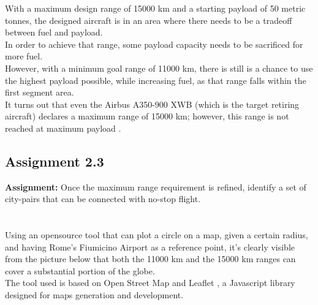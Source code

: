 \documentclass{article}
\begin{document}
With a maximum design range of 15000 km and a starting payload of 50 metric tonnes, 
the designed aircraft is in an area where there needs to be a tradeoff between fuel and payload.\\ 
In order to achieve that range, some payload capacity needs to be sacrificed for more fuel.\\ 
However, with a minimum goal range of 11000 km, there is still is a chance to use the highest payload possible,
while increasing fuel, as that range falls within the first segment area. \\ 
It turns out that even the Airbus A350-900 XWB (which is the target retiring aircraft) declares
a maximum range of 15000 km; however, this range is not reached at maximum payload \autocite{Airbus_A350-900}.

\pagebreak
\subsection{Assignment 2.3\label{Assignment_2.3}}
\textbf{Assignment:} Once the maximum range requirement is refined,
 identify a set of city-pairs that can be connected with no-stop flight. \\ \\ \\ 

Using an opensource tool \autocite{OSM_radius_plotter} that can plot a circle on a map, given a certain radius, and having
Rome's Fiumicino Airport as a reference point, it's clearly visible from the picture below that both the 11000 km and the 15000 km ranges
can cover a substantial portion of the globe.\\ 
The tool used is based on Open Street Map \autocite{Open_Street_Map} and Leaflet \autocite{Leaflet}, a Javascript library
designed for maps generation and development. \\ 
\end{document}

